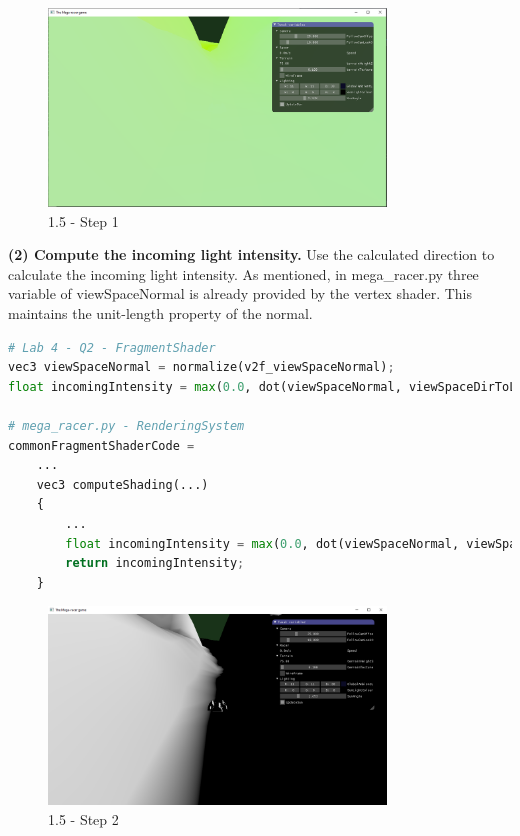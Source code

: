 \documentclass[a4 paper, 12pt]{article}
\begin{document}
    \begin{figure} [H]
        \centering
        \includegraphics[width=0.8\textwidth, frame]
            {./images/1.5_a.PNG}
        \caption{1.5 - Step 1}
    \end{figure}

\textbf{(2) Compute the incoming light intensity.}
Use the calculated direction to calculate the incoming light intensity. As mentioned, in mega\_racer.py three variable of viewSpaceNormal is already provided by the vertex shader. This maintains the unit-length property of the normal.
    \begin{lstlisting}[language=python] 
# Lab 4 - Q2 - FragmentShader
vec3 viewSpaceNormal = normalize(v2f_viewSpaceNormal);
float incomingIntensity = max(0.0, dot(viewSpaceNormal, viewSpaceDirToLight));

# mega_racer.py - RenderingSystem
commonFragmentShaderCode =
    ...
    vec3 computeShading(...)
    {
        ...
        float incomingIntensity = max(0.0, dot(viewSpaceNormal, viewSpaceDirToLight));
        return incomingIntensity;
    }
    \end{lstlisting}

    \begin{figure} [H]
        \centering
        \includegraphics[width=0.8\textwidth, frame]
            {./images/1.5_b.PNG}
        \caption{1.5 - Step 2}
    \end{figure}
\end{document}
